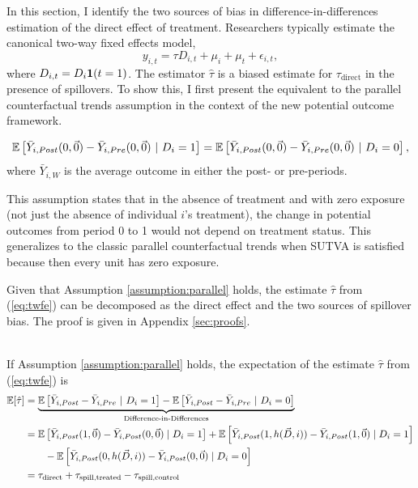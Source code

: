 \documentclass[11pt]{article}
\begin{document}
In this section, I identify the two sources of bias in difference-in-differences estimation of the direct effect of treatment. Researchers typically estimate the canonical two-way fixed effects model, 
\begin{equation}\label{eq:twfe}    
    y_{i,t} = \tau D_{i,t} + \mu_i + \mu_t + \epsilon_{i,t},
\end{equation}
where $D_{i,t} = D_i \mathbf{1}(t = 1)$. The estimator $\hat{\tau}$ is a biased estimate for $\tau_{\text{direct}}$ in the presence of spillovers. To show this, I first present the equivalent to the parallel counterfactual trends assumption in the context of the new potential outcome framework. 

\begin{assumption}\label{assumption:parallel}
    \[ 
        \mathbb{E}\left[\bar{Y}_{i,Post}(0, \vec{0}) - \bar{Y}_{i,Pre}(0, \vec{0}) \ \vert \ D_i = 1 \right] = 
        \mathbb{E}\left[\bar{Y}_{i,Post}(0, \vec{0}) - \bar{Y}_{i,Pre}(0, \vec{0}) \ \vert \ D_i = 0 \right],
    \]
    where $\bar{Y}_{i,W}$ is the average outcome in either the post- or pre-periods.
\end{assumption}
This assumption states that in the absence of treatment and with zero exposure (not just the absence of individual $i$'s treatment), the change in potential outcomes from period 0 to 1 would not depend on treatment status. This generalizes to the classic parallel counterfactual trends when SUTVA is satisfied because then every unit has zero exposure.

Given that Assumption \ref{assumption:parallel} holds, the estimate $\hat{\tau}$ from (\ref{eq:twfe}) can be decomposed as the direct effect and the two sources of spillover bias. The proof is given in Appendix \ref{sec:proofs}.

\begin{proposition}\label{thm:bias}\ \\    
    If Assumption \ref{assumption:parallel} holds, the expectation of the estimate $\hat{\tau}$ from (\ref{eq:twfe}) is
    \begin{align*}
        \mathbb{E}[\hat{\tau}] &= \underbrace{\mathbb{E}\left[\bar{Y}_{i,Post} - \bar{Y}_{i,Pre} \ \vert \ D_i = 1 \right] - \mathbb{E}\left[\bar{Y}_{i,Post} - \bar{Y}_{i,Pre} \ \vert \ D_i = 0 \right]}_{\text{Difference-in-Differences}} \\ 
        &= 
        \mathbb{E}\left[\bar{Y}_{i,Post}(1, \vec{0}) - \bar{Y}_{i,Post}(0, \vec{0}) \mid D_i = 1\right] + \mathbb{E}\left[\bar{Y}_{i,Post}(1, h(\vec{D}, i)) - \bar{Y}_{i,Post}(1, \vec{0}) \mid D_i = 1\right] \\
        &\quad\quad - \mathbb{E}\left[\bar{Y}_{i,Post}(0, h(\vec{D}, i)) - \bar{Y}_{i,Post}(0, \vec{0}) \mid D_i = 0\right] \\
        &= \tau_{\text{direct}} + \tau_{\text{spill,treated}} - \tau_{\text{spill,control}}
    \end{align*}
\end{proposition}
\end{document}
